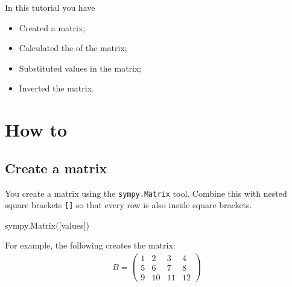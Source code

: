 \begin{note}
In this tutorial you have
\begin{itemize}
\item 

Created a matrix;

\item 

Calculated the  of the matrix;

\item 

Substituted values in the matrix;

\item 

Inverted the matrix.

\end{itemize}
\end{note}





\section{How to}
\label{\detokenize{tools-for-mathematics/04-matrices/how/main:how}}\label{\detokenize{tools-for-mathematics/04-matrices/how/main::doc}}

\subsection{Create a matrix}
\label{\detokenize{tools-for-mathematics/04-matrices/how/main:create-a-matrix}}

You create a matrix using the \texttt{sympy.Matrix} tool. Combine this with
nested square brackets \texttt{{[}{]}} so that every row is also inside square
brackets.


\begin{api}
sympy.Matrix([values])
\end{api}



For example, the following creates the matrix:
\begin{equation*}
\begin{split}
    B = \begin{pmatrix}
            1 & 2 & 3 & 4\\
            5 & 6 & 7 & 8\\
            9 & 10 & 11 & 12
        \end{pmatrix}
\end{split}
\end{equation*}



